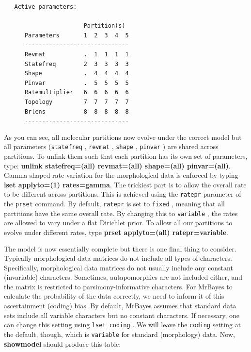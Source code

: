 \documentclass[12pt]{book}
\newcommand{\ttt}[1]{\texttt{#1} }
\begin{document}
\begin{singlespacing}
\small
\begin{verbatim}
   Active parameters:
 
                       Partition(s)
      Parameters       1  2  3  4  5
      ------------------------------
      Revmat           .  1  1  1  1
      Statefreq        2  3  3  3  3
      Shape            .  4  4  4  4
      Pinvar           .  5  5  5  5
      Ratemultiplier   6  6  6  6  6
      Topology         7  7  7  7  7
      Brlens           8  8  8  8  8
      ------------------------------
\end{verbatim}
\normalsize
\end{singlespacing}

As you can see, all molecular partitions now evolve under the correct model but all parameters
(\ttt{statefreq}, \ttt{revmat}, \ttt{shape}, \ttt{pinvar}) are shared across
partitions. To unlink them such that each partition has its own set of parameters, type:
\textbf{unlink statefreq=(all) revmat=(all) shape=(all) pinvar=(all)}. Gamma-shaped rate variation
for the morphological data is enforced by typing \textbf{lset applyto=(1) rates=gamma}. The
trickiest part is to allow the overall rate to be different across partitions. This is achieved
using the \ttt{ratepr} parameter of the \ttt{prset} command. By default, \ttt{ratepr} is
set to \ttt{fixed}, meaning that all partitions have the same overall rate.  By changing this to
\ttt{variable}, the rates are allowed to vary under a flat Dirichlet prior. To allow all our
partitions to evolve under different rates, type \textbf{prset applyto=(all) ratepr=variable}.

The model is now essentially complete but there is one final thing to consider. Typically
morphological data matrices do not include all types of characters. Specifically, morphological
data matrices do not usually include any constant (invariable) characters. Sometimes,
autapomorphies are not included either, and the matrix is restricted to parsimony-informative
characters. For MrBayes to calculate the probability of the data correctly, we need to inform it of
this ascertainment (coding) bias. By default, MrBayes assumes that standard data sets include all
variable characters but no constant characters. If necessary, one can change this setting using
\ttt{lset coding}. We will leave the \ttt{coding} setting at the default, though, which is
\ttt{variable} for standard (morphology) data. Now, \textbf{showmodel} should produce this
table:
\end{document}
